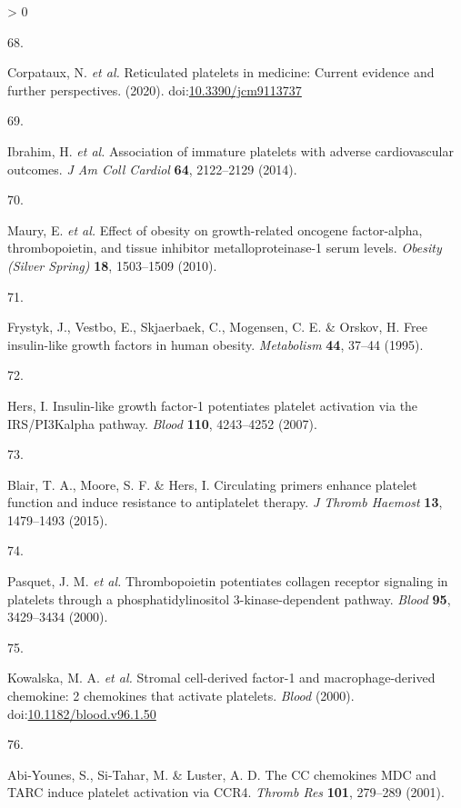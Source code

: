 \documentclass[11pt,twoside]{bristolthesis}
\newlength{\cslhangindent}
\newlength{\csllabelwidth}
\newenvironment{CSLReferences}[2] %
 {%
  \setlength{\parindent}{0pt}
  \ifodd #1 \everypar{\setlength{\hangindent}{\cslhangindent}}\ignorespaces\fi
  \ifnum #2 > 0
  \setlength{\parskip}{#2\baselineskip}
  \fi
 }%
 {}
\newcommand{\CSLLeftMargin}[1]{\parbox[t]{\csllabelwidth}{#1}}
\newcommand{\CSLRightInline}[1]{\parbox[t]{\linewidth - \csllabelwidth}{#1}\break}
\begin{document}
\begin{CSLReferences}{0}{0}
\leavevmode\hypertarget{ref-Corpataux2020}{}%
\CSLLeftMargin{68. }
\CSLRightInline{Corpataux, N. \emph{et al.} {Reticulated platelets in medicine: Current evidence and further perspectives}. (2020). doi:\href{https://doi.org/10.3390/jcm9113737}{10.3390/jcm9113737}}

\leavevmode\hypertarget{ref-Ibrahim2014}{}%
\CSLLeftMargin{69. }
\CSLRightInline{Ibrahim, H. \emph{et al.} {Association of immature platelets with adverse cardiovascular outcomes}. \emph{J Am Coll Cardiol} \textbf{64}, 2122--2129 (2014).}

\leavevmode\hypertarget{ref-Maury2010a}{}%
\CSLLeftMargin{70. }
\CSLRightInline{Maury, E. \emph{et al.} {Effect of obesity on growth-related oncogene factor-alpha, thrombopoietin, and tissue inhibitor metalloproteinase-1 serum levels}. \emph{Obesity (Silver Spring)} \textbf{18}, 1503--1509 (2010).}

\leavevmode\hypertarget{ref-Frystyk1995}{}%
\CSLLeftMargin{71. }
\CSLRightInline{Frystyk, J., Vestbo, E., Skjaerbaek, C., Mogensen, C. E. \& Orskov, H. {Free insulin-like growth factors in human obesity}. \emph{Metabolism} \textbf{44}, 37--44 (1995).}

\leavevmode\hypertarget{ref-Hers2007}{}%
\CSLLeftMargin{72. }
\CSLRightInline{Hers, I. {Insulin-like growth factor-1 potentiates platelet activation via the IRS/PI3Kalpha pathway}. \emph{Blood} \textbf{110}, 4243--4252 (2007).}

\leavevmode\hypertarget{ref-Blair2015}{}%
\CSLLeftMargin{73. }
\CSLRightInline{Blair, T. A., Moore, S. F. \& Hers, I. {Circulating primers enhance platelet function and induce resistance to antiplatelet therapy}. \emph{J Thromb Haemost} \textbf{13}, 1479--1493 (2015).}

\leavevmode\hypertarget{ref-Pasquet2000}{}%
\CSLLeftMargin{74. }
\CSLRightInline{Pasquet, J. M. \emph{et al.} {Thrombopoietin potentiates collagen receptor signaling in platelets through a phosphatidylinositol 3-kinase-dependent pathway}. \emph{Blood} \textbf{95}, 3429--3434 (2000).}

\leavevmode\hypertarget{ref-Kowalska2000}{}%
\CSLLeftMargin{75. }
\CSLRightInline{Kowalska, M. A. \emph{et al.} {Stromal cell-derived factor-1 and macrophage-derived chemokine: 2 chemokines that activate platelets}. \emph{Blood} (2000). doi:\href{https://doi.org/10.1182/blood.v96.1.50}{10.1182/blood.v96.1.50}}

\leavevmode\hypertarget{ref-Abi-Younes2001}{}%
\CSLLeftMargin{76. }
\CSLRightInline{Abi-Younes, S., Si-Tahar, M. \& Luster, A. D. {The CC chemokines MDC and TARC induce platelet activation via CCR4}. \emph{Thromb Res} \textbf{101}, 279--289 (2001).}


\end{CSLReferences}
\end{document}
